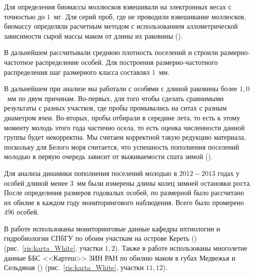 Для определения биомассы моллюсков взвешивали на электронных весах с точностью до $1$~мг. 
Для серий проб, где не проводили взвешивание моллюсков, биомассу определяли расчетным методом с использованием аллометрической зависимости сырой массы маком от длины их раковины (\cite{Maximovich_et_al_1993}). 

В дальнейшем рассчитывали среднюю плотность поселений и строили размерно-частотное распределение особей.
Для построения размерно-частотного распределения шаг размерного класса составлял $1$~мм.

В дальнейшем при анализе мы работали с особями с длиной раковины более $1,0$~мм по двум причинам. 
Во-первых, для того чтобы сделать сравнимыми результаты с разных участков, где пробы промывались на ситах с разным диаметром ячеи. 
Во-вторых, пробы отбирали в середине лета, то есть к этому моменту молодь этого года частично осела, то есть оценка численности данной группы будет некорректна.
Мы считаем корректной такую редукцию материала, поскольку для Белого моря считается, что успешность пополнения поселений молодью в первую очередь зависит от выживаемости спата зимой (\cite{Maximovich_Gerasimova_2004}).

Для анализа динамики пополнения поселений молодью в $2012 - 2013$ годах у особей длиной менее $3$~мм были измерены длины колец зимней остановки роста. 
После определения размеров годовалых особей, по размерной было рассчитано их обилие в каждом году мониторингового наблюдения.
Всего было промерено 496 особей.



В работе использованы мониторинговые данные кафедры ихтиологии и гидробиологии СПбГУ по обоим участкам на острове Кереть (\cite{Maximovich_et_al_1991, Gerasimova_Maximovich_2013}) (рис.~\ref{ris:karta_White}, участки $1, 2$). 
Также в работе использованы многолетие данные ББС <<Картеш>> ЗИН РАН по обилию маком в губах Медвежья и Сельдяная (\cite{Varfolomeeva_Naumov_2013}) (рис.~\ref{ris:karta_White}, участки $11, 12$).


 



